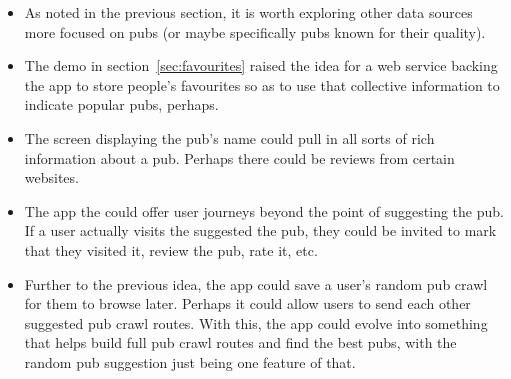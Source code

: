 \documentclass{report}
\begin{document}
\begin{itemize}
\item
  As noted in the previous section, it is worth exploring other
  data sources more focused on pubs (or maybe specifically pubs
  known for their quality).
\item
  The demo in section~\ref{sec:favourites} raised the idea for
  a web service backing the app to store people's favourites so as
  to use that collective information to indicate popular pubs, perhaps.
\item
  The screen displaying the pub's name could pull in all sorts of
  rich information about a pub. Perhaps there could be reviews from
  certain websites.
\item
  The app the could offer user journeys beyond the point of suggesting
  the pub. If a user actually visits the suggested the pub, they could
  be invited to mark that they visited it, review the pub, rate it, etc.
\item
  Further to the previous idea, the app could save a user's random
  pub crawl for them to browse later. Perhaps it could allow users
  to send each other suggested pub crawl routes. With this, the app
  could evolve into something that helps build full pub crawl routes
  and find the best pubs, with the random pub suggestion just being
  one feature of that.
\end{itemize}
\end{document}
